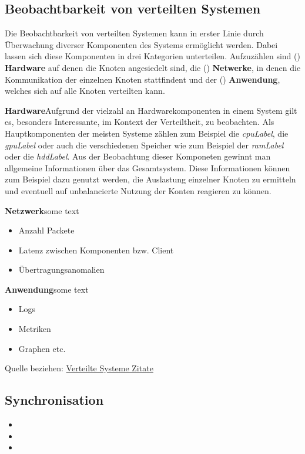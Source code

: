 \subsection{Beobachtbarkeit von verteilten Systemen}

	Die Beobachtbarkeit von verteilten Systemen kann in erster Linie durch Überwachung diverser Komponenten des Systems ermöglicht werden. Dabei lassen sich diese Komponenten in drei Kategorien unterteilen. Aufzuzählen sind () \textbf{Hardware} auf denen die Knoten angesiedelt sind, die () \textbf{Netwerke}, in denen die Kommunikation der einzelnen Knoten stattfindent und der () \textbf{Anwendung}, welches sich auf alle Knoten verteilten kann.

	
	\textbf{Hardware}\space\space\space Aufgrund der vielzahl an Hardwarekomponenten in einem System gilt es, besonders Interessante, im Kontext der Verteiltheit, zu beobachten. Als Hauptkomponenten der meisten Systeme zählen zum Beispiel die \emph{\gls{cpuLabel}}, die \emph{\gls{gpuLabel}} oder auch die verschiedenen Speicher wie zum Beispiel der \emph{\gls{ramLabel}} oder die \emph{\gls{hddLabel}}. Aus der Beobachtung dieser Komponeten gewinnt man allgemeine Informationen über das Gesamtsystem. Diese Informationen können zum Beispiel dazu genutzt werden, die Auslastung einzelner Knoten zu ermitteln und eventuell auf unbalancierte Nutzung der Konten reagieren zu können.
	
	\textbf{Netzwerk}\space\space\space some text
	
	\begin{itemize}
		\item Anzahl Packete
		\item Latenz zwischen Komponenten bzw. Client
		\item Übertragungsanomalien
	\end{itemize}
	
	\textbf{Anwendung}\space\space\space some text
	
	\begin{itemize}
		\item Logs
		\item Metriken
		\item Graphen etc. 
	\end{itemize}

Quelle beziehen:
\href{https://de.wikipedia.org/wiki/Verteiltes_System}{Verteilte Systeme Zitate}
\subsection{Synchronisation}
\begin{itemize}
	\item 
	\item 
	\item
\end{itemize}
